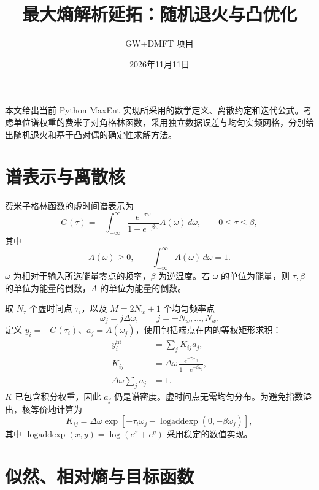 \documentclass[UTF8,fontset=fandol,11pt]{ctexart}
\title{最大熵解析延拓：随机退火与凸优化}
\author{GW+DMFT 项目}
\date{2026年11月11日}
\begin{document}
\maketitle

本文给出当前 Python MaxEnt 实现所采用的数学定义、离散约定和迭代公式。考虑单位谱权重的费米子对角格林函数，采用独立数据误差与均匀实频网格，分别给出随机退火和基于凸对偶的确定性求解方法。

\section{谱表示与离散核}
费米子格林函数的虚时间谱表示为
\begin{equation}
    G(\tau)=-\int_{-\infty}^{\infty}\frac{e^{-\tau\omega}}{1+e^{-\beta\omega}}A(\omega)\,d\omega,\qquad 0\leq\tau\leq\beta,
\end{equation}
其中
\begin{equation}
    A(\omega)\geq0,\qquad \int_{-\infty}^{\infty}A(\omega)\,d\omega=1.
\end{equation}
$\omega$ 为相对于输入所选能量零点的频率，$\beta$ 为逆温度。若 $\omega$ 的单位为能量，则 $\tau,\beta$ 的单位为能量的倒数，$A$ 的单位为能量的倒数。

取 $N_\tau$ 个虚时间点 $\tau_i$，以及 $M=2N_w+1$ 个均匀频率点
\begin{equation}
    \omega_j=j\Delta\omega,\qquad j=-N_w,\ldots,N_w.
\end{equation}
定义 $y_i=-G(\tau_i)$、$a_j=A(\omega_j)$，使用包括端点在内的等权矩形求积：
\begin{align}
    y_i^{\mathrm{fit}}&=\sum_jK_{ij}a_j,\\
    K_{ij}&=\Delta\omega\,\frac{e^{-\tau_i\omega_j}}{1+e^{-\beta\omega_j}},\\
    \Delta\omega\sum_j a_j&=1.
\end{align}
$K$ 已包含积分权重，因此 $a_j$ 仍是谱密度。虚时间点无需均匀分布。为避免指数溢出，核等价地计算为
\begin{equation}
    K_{ij}=\Delta\omega\exp\!\left[-\tau_i\omega_j-\operatorname{logaddexp}(0,-\beta\omega_j)\right],
\end{equation}
其中 $\operatorname{logaddexp}(x,y)=\log(e^x+e^y)$ 采用稳定的数值实现。

\section{似然、相对熵与目标函数}
\end{document}
